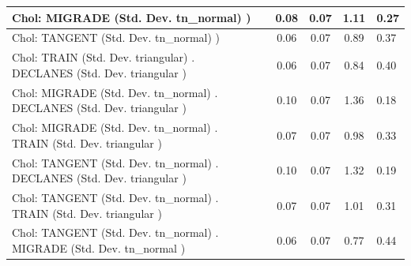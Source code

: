 \begin{table}
\begin{center}
\begin{tabular}{|l|l|c|c|c|l|}
			\hline
			 Chol: MIGRADE (Std. Dev. tn_normal) ) &  & 0.08 & 0.07 & 1.11 & 0.27 \\
			\hline
			 Chol: TANGENT (Std. Dev. tn_normal) ) &  & 0.06 & 0.07 & 0.89 & 0.37 \\
			\hline
			 Chol: TRAIN (Std. Dev. triangular) . DECLANES (Std. Dev.   triangular ) &  & 0.06 & 0.07 & 0.84 & 0.40 \\
			\hline
			 Chol: MIGRADE (Std. Dev. tn_normal) . DECLANES (Std. Dev.   triangular ) &  & 0.10 & 0.07 & 1.36 & 0.18 \\
			\hline
			 Chol: MIGRADE (Std. Dev. tn_normal) . TRAIN (Std. Dev.   triangular ) &  & 0.07 & 0.07 & 0.98 & 0.33 \\
			\hline
			 Chol: TANGENT (Std. Dev. tn_normal) . DECLANES (Std. Dev.   triangular ) &  & 0.10 & 0.07 & 1.32 & 0.19 \\
			\hline
			 Chol: TANGENT (Std. Dev. tn_normal) . TRAIN (Std. Dev.   triangular ) &  & 0.07 & 0.07 & 1.01 & 0.31 \\
			\hline
			 Chol: TANGENT (Std. Dev. tn_normal) . MIGRADE (Std. Dev.   tn_normal ) &  & 0.06 & 0.07 & 0.77 & 0.44 \\
			\hline
		\end{tabular}
	\end{center}
\end{table}